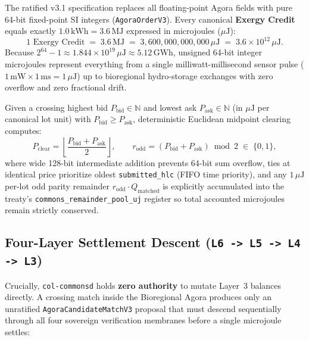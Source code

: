 The ratified v3.1 specification replaces all floating-point Agora fields with pure 64-bit fixed-point SI integers (\texttt{AgoraOrderV3}). Every canonical \textbf{Exergy Credit} equals exactly $1.0\,\mathrm{kWh} = 3.6\,\mathrm{MJ}$ expressed in microjoules ($\mu\mathrm{J}$):
\begin{equation}
  1\text{ Exergy Credit} \;=\; 3.6\,\mathrm{MJ} \;=\; 3{,}600{,}000{,}000{,}000\,\mu\mathrm{J} \;=\; 3.6 \times 10^{12}\,\mu\mathrm{J}.
  \label{eq:exergy-credit-uj}
\end{equation}
Because $2^{64} - 1 \approx 1.844 \times 10^{19}\,\mu\mathrm{J} \approx 5.12\,\mathrm{GWh}$, unsigned 64-bit integer microjoules represent everything from a single milliwatt-millisecond sensor pulse ($1\,\mathrm{mW} \times 1\,\mathrm{ms} = 1\,\mu\mathrm{J}$) up to bioregional hydro-storage exchanges with zero overflow and zero fractional drift.

Given a crossing highest bid $P_{\mathrm{bid}} \in \mathbb{N}$ and lowest ask $P_{\mathrm{ask}} \in \mathbb{N}$ (in $\mu\mathrm{J}$ per canonical lot unit) with $P_{\mathrm{bid}} \ge P_{\mathrm{ask}}$, deterministic Euclidean midpoint clearing computes:
\begin{equation}
  P_{\mathrm{clear}} = \left\lfloor \frac{P_{\mathrm{bid}} + P_{\mathrm{ask}}}{2} \right\rfloor, \qquad
  r_{\mathrm{odd}} = \left(P_{\mathrm{bid}} + P_{\mathrm{ask}}\right) \bmod 2 \;\in\; \{0, 1\},
  \label{eq:euclidean-midpoint-cda}
\end{equation}
where wide 128-bit intermediate addition prevents 64-bit sum overflow, ties at identical price prioritize oldest \texttt{submitted\_hlc} (FIFO time priority), and any $1\,\mu\mathrm{J}$ per-lot odd parity remainder $r_{\mathrm{odd}} \cdot Q_{\mathrm{matched}}$ is explicitly accumulated into the treaty's \texttt{commons\_remainder\_pool\_uj} register so total accounted microjoules remain strictly conserved.

\subsection{Four-Layer Settlement Descent (\texttt{L6 -> L5 -> L4 -> L3})}

Crucially, \texttt{col-commonsd} holds \textbf{zero authority} to mutate Layer~3 balances directly. A crossing match inside the Bioregional Agora produces only an unratified \texttt{AgoraCandidateMatchV3} proposal that must descend sequentially through all four sovereign verification membranes before a single microjoule settles:

